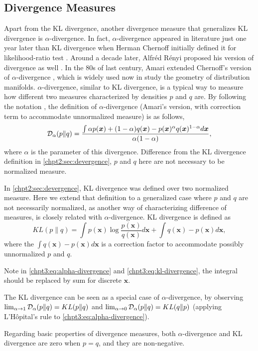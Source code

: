 \subsection{Divergence Measures}
Apart from the KL divergence, another divergence measure that generalizes KL divergence is $\alpha$-divergence. In fact, $\alpha$-divergence appeared in literature just one year later than KL divergence when Herman Chernoff initially defined it for likelihood-ratio test \cite{Chernoff1952measure}. Around a decade later, Alfr\'ed R\'enyi proposed his version of divergence as well \cite{renyi1961entropy}. In the 80s of last century, Amari extended Chernoff's version of $\alpha$-divergence \cite{amari1982differential}, which is widely used now in study the geometry of distribution manifolds. 
$\alpha$-divergence, similar to KL divergence, is a typical way to measure how different two measures characterized by densities $p$ and $q$ are. By following the notation \cite{Zhu95informationgeometric}, the definition of $\alpha$-divergence (Amari's version, with correction term to accommodate unnormalized measure) is as follows,
\begin{equation}\label{chpt3:eq:alpha-divergence}
  \mathcal{D}_{\alpha}(p \| q ) = \frac{\int \alpha p(\bm{x}) + (1-\alpha) q (\bm{x}) - p(\bm{x})^{\alpha} q(\bm{x})^{1-\alpha} d\bm{x}}{\alpha(1-\alpha)},
\end{equation}
where $\alpha$ is the parameter of this divergence. Difference from the KL divergence definition in \autoref{chpt2:sec:devergence}, $p$ and $q$ here are not necessary to be normalized measure.

In \autoref{chpt2:sec:devergence}, KL divergence was defined over two normalized measure. Here we extend that definition to a generalized case where $p$ and $q$ are not necessarily normalized, as another way of characterizing difference of measures, is closely related with $\alpha$-divergence. KL divergence is defined as
\begin{equation}\label{chpt3:eq:kl-divergence}
  KL(p \| q) = \int p(\bm{x}) \log{\frac{p(\bm{x})}{q(\bm{x})}} d \bm{x}+ \int q(\bm{x}) - p(\bm{x}) d\bm{x},
\end{equation}
where the $\int q(\bm{x}) - p(\bm{x}) d\bm{x}$ is a correction factor to accommodate possibly unnormalized $p$ and $q$.
\begin{remark}
  Note in \eqref{chpt3:eq:alpha-divergence} and \eqref{chpt3:eq:kl-divergence}, the integral should be replaced by sum for discrete $\bm{x}$.
\end{remark}
\begin{remark}
The KL divergence can be seen as a special case of $\alpha$-divergence, by observing $\lim_{\alpha \rightarrow 1}\mathcal{D}_{\alpha}(p \| q ) = KL(p\|q)$ and $\lim_{\alpha \rightarrow 0}\mathcal{D}_{\alpha}(p \| q ) = KL(q\|p)$ (applying L'H\^opital's rule to \eqref{chpt3:eq:alpha-divergence}).

Regarding basic properties of divergence measures, both $\alpha$-divergence and KL divergence are zero when $p=q$, and they are non-negative. 
\end{remark}

